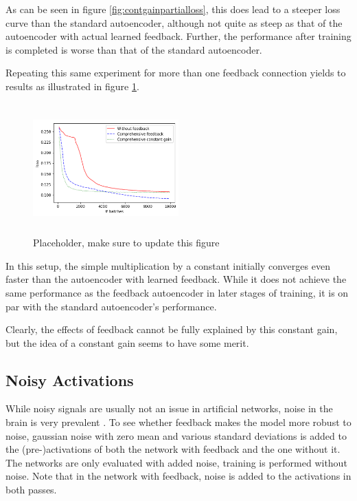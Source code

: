 \documentclass{article}
\begin{document}
  As can be seen in figure \ref{fig:contgainpartialloss}, this does lead to a steeper loss curve than the standard autoencoder, although not quite as steep as that of the autoencoder with actual learned feedback. Further, the performance after training is completed is worse than that of the standard autoencoder. 
  
  Repeating this same experiment for more than one feedback connection yields to results as illustrated in figure \ref{fig:contgainfullloss}. 
  
  \begin{figure}
      \centering
      \includegraphics[width=0.5\textwidth,height=5cm,keepaspectratio]{img/constgainfull_loss.png}
      \caption{Placeholder, make sure to update this figure}
      \label{fig:contgainfullloss}
  \end{figure}
  
  In this setup, the simple multiplication by a constant initially converges even faster than the autoencoder with learned feedback. While it does not achieve the same performance as the feedback autoencoder in later stages of training, it is on par with the standard autoencoder's performance. 
  
  Clearly, the effects of feedback cannot be fully explained by this constant gain, but the idea of a constant gain seems to have some merit. 


\subsection{Noisy Activations} 
\label{noisyacts}
While noisy signals are usually not an issue in artificial networks, noise in the brain is very prevalent \cite{Faisal2008}. To see whether feedback makes the model more robust to noise, gaussian noise with zero mean and various standard deviations is added to the (pre-)activations of both the network with feedback and the one without it. The networks are only evaluated with added noise, training is performed without noise. Note that in the network with feedback, noise is added to the activations in both passes.    
\end{document}
